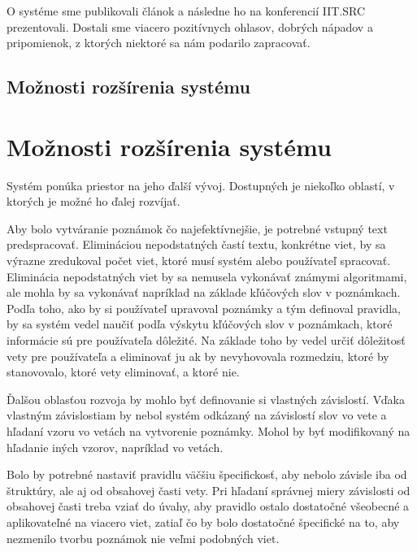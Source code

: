 O systéme sme publikovali článok a následne ho na konferencií IIT.SRC prezentovali. Dostali sme viacero pozitívnych ohlasov, dobrých nápadov a pripomienok, z ktorých niektoré sa nám podarilo zapracovať.

%
%
{
	\subsection{Možnosti rozšírenia systému}
}
{
	\section{Možnosti rozšírenia systému}
}
\label{subsection:system_continue}
Systém ponúka priestor na jeho ďalší vývoj. Dostupných je niekoľko oblastí, v ktorých je možné ho ďalej rozvíjať.

Aby bolo vytváranie poznámok čo najefektívnejšie, je potrebné vstupný text predspracovať. Elimináciou nepodstatných častí textu, konkrétne viet, by sa výrazne zredukoval počet viet, ktoré musí systém alebo používateľ spracovať. Eliminácia nepodstatných viet by sa nemusela vykonávať známymi algoritmami, ale mohla by sa vykonávať napríklad na základe kľúčových slov v poznámkach. Podľa toho, ako by si používateľ upravoval poznámky a tým definoval pravidla, by sa systém vedel naučiť podľa výskytu kľúčových slov v poznámkach, ktoré informácie sú pre používateľa dôležité. Na základe toho by vedel určiť dôležitosť vety pre používateľa a eliminovať ju ak by nevyhovovala rozmedziu, ktoré by stanovovalo, ktoré vety eliminovať, a ktoré nie.

Ďalšou oblasťou rozvoja by mohlo byť definovanie si vlastných závislostí. Vďaka vlastným závislostiam by nebol systém odkázaný na závislostí slov vo vete a hľadaní vzoru vo vetách na vytvorenie poznámky. Mohol by byť modifikovaný na hľadanie iných vzorov, napríklad vo vetách.

Bolo by potrebné nastaviť pravidlu väčšiu špecifickosť, aby nebolo závisle iba od štruktúry, ale aj od obsahovej časti vety. Pri hľadaní správnej miery závislosti od obsahovej časti treba vziať do úvahy, aby pravidlo ostalo dostatočné všeobecné a aplikovateľné na viacero viet, zatiaľ čo by bolo dostatočné špecifické na to, aby nezmenilo tvorbu poznámok nie veľmi podobných viet.